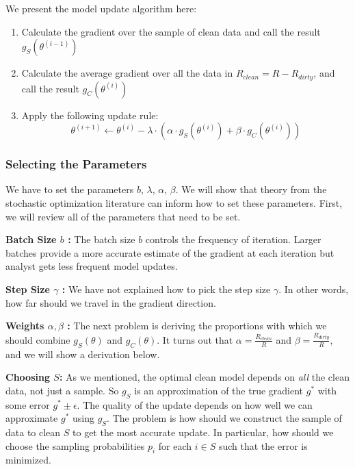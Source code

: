 We present the model update algorithm here:
\begin{enumerate}[noitemsep]
	\item Calculate the gradient over the sample of clean data and call the result $g_S(\theta^{(i-1)})$
	\item Calculate the average gradient over all the data in $R_{clean}=R-R_{dirty}$, and call the result $g_C(\theta^{(i)})$
	\item Apply the following update rule:
	\[
	\theta^{(i+1)} \leftarrow \theta^{(i)} - \lambda \cdot(\alpha\cdot g_S(\theta^{(i)}) + \beta \cdot  g_C(\theta^{(i)}))
	\]
\end{enumerate} 

\subsubsection{Selecting the Parameters}\label{params}
We have to set the parameters $b$, $\lambda$, $\alpha$, $\beta$.
We will show that theory from the stochastic optimization literature can inform how to set these parameters.
First, we will review all of the parameters that need to be set.

\noindent\textbf{Batch Size $b$ : } The batch size $b$ controls the frequency of iteration. Larger batches provide a more accurate estimate of the gradient at each iteration but analyst gets less frequent model updates. 

\vspace{0.5em}

\noindent\textbf{Step Size $\gamma$ : } We have not explained how to pick the step size $\gamma$. In other words, how far should we travel in the gradient direction.

\vspace{0.5em}

\noindent\textbf{Weights $\alpha,\beta$ : } The next problem is deriving the proportions with which we should combine $g_S(\theta)$ and $g_C(\theta)$. It turns out that $\alpha = \frac{R_{clean}}{R}$ and $\beta = \frac{R_{dirty}}{R}$, and we will show a derivation below.

\vspace{0.5em}

\noindent\textbf{Choosing $S$: } As we mentioned, the optimal clean model depends on \emph{all} the clean data, not just a sample. 
So $g_S$ is an approximation of the true gradient $g^*$ with some error $g^* \pm \epsilon$. 
The quality of the update depends on how well we can approximate $g^*$ using $g_S$.
The problem is how should we construct the sample of data to clean $S$ to get the most accurate update.
In particular, how should we choose the sampling probabilities $p_i$ for each $i \in S$ such that the error is minimized.

